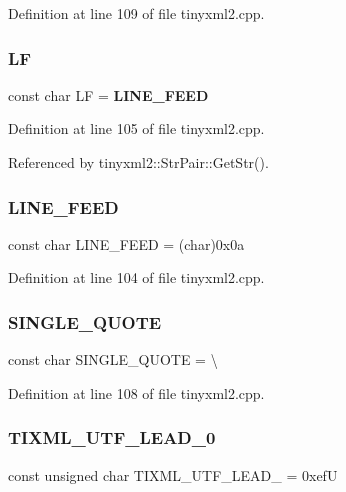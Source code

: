 Definition at line 109 of file tinyxml2.\+cpp.

\mbox{\label{tinyxml2_8cpp_a19b283812883e1dad22bbde25738643a}} 
\subsubsection{LF}
{\footnotesize\ttfamily const char LF = \textbf{ L\+I\+N\+E\+\_\+\+F\+E\+ED}\hspace{0.3cm}{\ttfamily [static]}}



Definition at line 105 of file tinyxml2.\+cpp.



Referenced by tinyxml2\+::\+Str\+Pair\+::\+Get\+Str().

\mbox{\label{tinyxml2_8cpp_aca0c283d60be29cdf68e753a97ce7ac2}} 
\subsubsection{LINE\_FEED}
{\footnotesize\ttfamily const char L\+I\+N\+E\+\_\+\+F\+E\+ED = (char)0x0a\hspace{0.3cm}{\ttfamily [static]}}



Definition at line 104 of file tinyxml2.\+cpp.

\mbox{\label{tinyxml2_8cpp_a65992cb0c2d3fc4eb9d13641f2e6e0f1}} 
\subsubsection{SINGLE\_QUOTE}
{\footnotesize\ttfamily const char S\+I\+N\+G\+L\+E\+\_\+\+Q\+U\+O\+TE = \textquotesingle{}\textbackslash{}\textquotesingle{}\textquotesingle{}\hspace{0.3cm}{\ttfamily [static]}}



Definition at line 108 of file tinyxml2.\+cpp.

\mbox{\label{tinyxml2_8cpp_a37999e32163e2a3280bc0b8e1999774e}} 
\subsubsection{TIXML\_UTF\_LEAD\_0}
{\footnotesize\ttfamily const unsigned char T\+I\+X\+M\+L\+\_\+\+U\+T\+F\+\_\+\+L\+E\+A\+D\+\_ = 0xefU\hspace{0.3cm}{\ttfamily [static]}}



